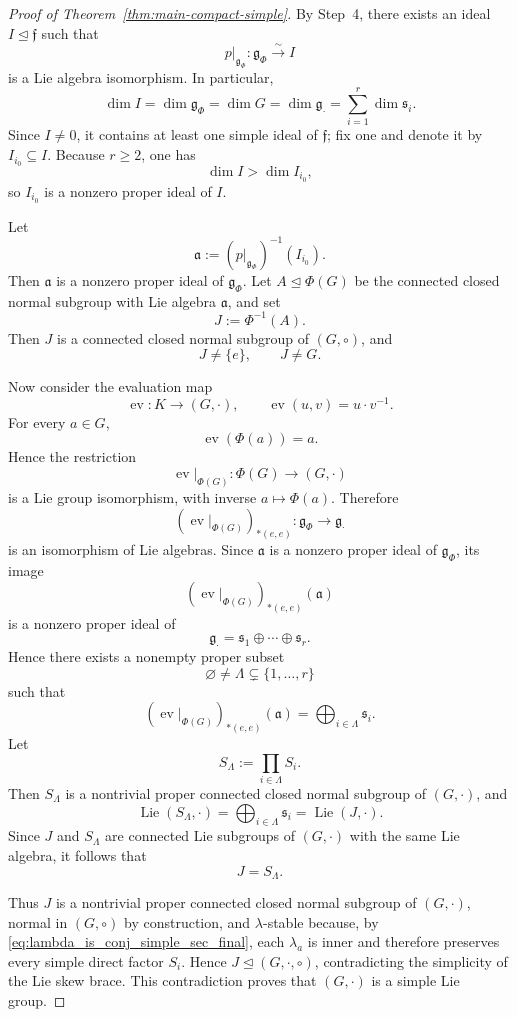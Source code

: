 \documentclass[reqno]{amsart}
\DeclareMathOperator{\Lie}{Lie}
\DeclareMathOperator{\ev}{ev}
\begin{document}
\begin{proof}[Proof of Theorem~\ref{thm:main-compact-simple}]
By Step~4, there exists an ideal \(I\trianglelefteq \mathfrak f\) such that
\[
p|_{\mathfrak g_\Phi}:\mathfrak g_\Phi\xrightarrow{\sim} I
\]
is a Lie algebra isomorphism. In particular,
\[
\dim I=\dim \mathfrak g_\Phi=\dim G=\dim \mathfrak g_{\cdot}
=\sum_{i=1}^r \dim \mathfrak s_i.
\]
Since \(I\neq 0\), it contains at least one simple ideal of \(\mathfrak f\);
fix one and denote it by
$I_{i_0}\subseteq I$.
Because \(r\ge 2\), one has
\[
\dim I>\dim I_{i_0},
\]
so \(I_{i_0}\) is a nonzero proper ideal of \(I\).

Let
\[
\mathfrak a:=(p|_{\mathfrak g_\Phi})^{-1}(I_{i_0}).
\]
Then \(\mathfrak a\) is a nonzero proper ideal of \(\mathfrak g_\Phi\).
Let \(A\trianglelefteq \Phi(G)\) be the connected closed normal subgroup with
Lie algebra \(\mathfrak a\), and set
\[
J:=\Phi^{-1}(A).
\]
Then \(J\) is a connected closed normal subgroup of \((G,\circ)\), and
\[
J\neq \{e\},
\qquad
J\neq G.
\]

Now consider the evaluation map
\[
\ev:K\longrightarrow (G,\cdot),
\qquad
\ev(u,v)=u\cdot v^{-1}.
\]
For every \(a\in G\),
\[
\ev(\Phi(a))=a.
\]
Hence the restriction
\[
\ev|_{\Phi(G)}:\Phi(G)\longrightarrow (G,\cdot)
\]
is a Lie group isomorphism, with inverse \(a\mapsto \Phi(a)\). Therefore
\[
(\ev|_{\Phi(G)})_{*(e,e)}:\mathfrak g_\Phi\longrightarrow \mathfrak g_{\cdot}
\]
is an isomorphism of Lie algebras.
Since \(\mathfrak a\) is a nonzero proper ideal of \(\mathfrak g_\Phi\), its
image
\[
(\ev|_{\Phi(G)})_{*(e,e)}(\mathfrak a)
\]
is a nonzero proper ideal of
\[
\mathfrak g_{\cdot}=\mathfrak s_1\oplus\cdots\oplus \mathfrak s_r.
\]
Hence there exists a nonempty proper subset
\[
\varnothing\neq \Lambda\subsetneq \{1,\dots,r\}
\]
such that
\[
(\ev|_{\Phi(G)})_{*(e,e)}(\mathfrak a)
=
\bigoplus_{i\in \Lambda}\mathfrak s_i.
\]
Let
\[
S_{\Lambda}:=\prod_{i\in \Lambda} S_i.
\]
Then \(S_{\Lambda}\) is a nontrivial proper connected closed normal subgroup of
\((G,\cdot)\), and
\[
\Lie(S_{\Lambda},\cdot)
=
\bigoplus_{i\in \Lambda}\mathfrak s_i
=
\Lie(J,\cdot).
\]
Since \(J\) and \(S_{\Lambda}\) are connected Lie subgroups of \((G,\cdot)\)
with the same Lie algebra, it follows that
\[
J=S_{\Lambda}.
\]

Thus \(J\) is a nontrivial proper connected closed normal subgroup of
\((G,\cdot)\), normal in \((G,\circ)\) by construction, and \(\lambda\)-stable
because, by \eqref{eq:lambda_is_conj_simple_sec_final}, each \(\lambda_a\) is
inner and therefore preserves every simple direct factor \(S_i\). Hence
$J\trianglelefteq (G,\cdot,\circ)$,
contradicting the simplicity of the Lie skew brace. This contradiction proves
that \((G,\cdot)\) is a simple Lie group.


\end{proof}
\end{document}
